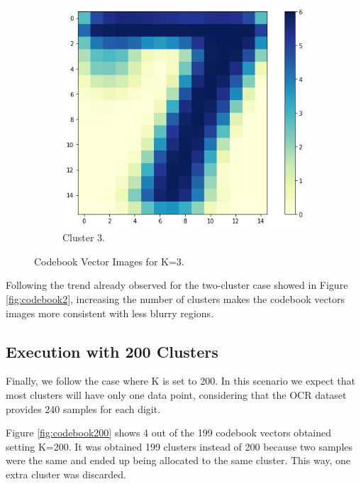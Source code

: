 \documentclass{article}
\begin{document}
\begin{figure}[h!]
\begin{subfigure}[b]{0.4\linewidth}
      \includegraphics[scale=0.4]{images/codebook_cluster3_3.png}
      \caption{Cluster 3.}
    \end{subfigure}
    \caption{Codebook Vector Images for K=3.}
    \label{fig:codebook3}
\end{figure}

Following the trend already observed for the two-cluster case showed in Figure \ref{fig:codebook2}, increasing the number of clusters makes the codebook vectors images more consistent with less blurry regions.

\subsection{Execution with 200 Clusters}

Finally, we follow the case where K is set to 200. In this scenario we expect that most clusters will have only one data point, considering that the OCR dataset provides 240 samples for each digit.

Figure \ref{fig:codebook200} shows 4 out of the 199 codebook vectors obtained setting K=200. It was obtained 199 clusters instead of 200 because two samples were  the same and ended up being allocated to the same cluster. This way, one extra cluster was discarded.
\end{document}
